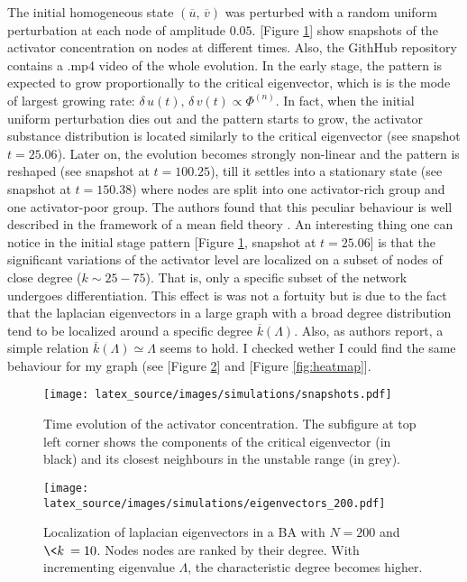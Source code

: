\noindent
The initial homogeneous state $(\overline{u},\,\overline{v})$ was perturbed with a random uniform perturbation at each node of amplitude $0.05$. [Figure \ref{fig:snapshots}] show snapshots of the activator concentration on nodes at different times. Also, the GithHub repository \cite{git} contains a .mp4 video of the whole evolution. \medskip \newline \noindent
In the early stage, the pattern is expected to grow proportionally to the critical eigenvector, which is is the mode of largest growing rate: $\delta\,u(t),\, \delta\,v(t) \propto \Phi^{(n)}$.
In fact, when the initial uniform perturbation dies out and the pattern starts to grow, the activator substance distribution is located similarly to the critical eigenvector (see snapshot $t = 25.06$). Later on, the evolution becomes strongly non-linear and the pattern is reshaped (see snapshot at $t = 100.25$), till it settles into a stationary state (see snapshot at $t = 150.38$) where nodes are split into one activator-rich group and one activator-poor group. The authors found that this peculiar behaviour is well described in the framework of a mean field theory \cite{main_network}. \medskip \newline \noindent
An interesting thing one can notice in the initial stage pattern [Figure \ref{fig:snapshots}, snapshot at $t = 25.06$] is that the significant variations of the activator level are localized on a subset of nodes of close degree ($k \sim 25-75$). That is, only a specific subset of the network undergoes differentiation. This effect is was not a fortuity but is due to the fact that the laplacian eigenvectors in a large graph with a broad degree distribution tend to be localized around a specific degree $\overline{k}(\Lambda)$. Also, as authors report, a simple relation $\overline{k}(\Lambda) \simeq \Lambda$ seems to hold. I checked wether I could find the same behaviour for my graph (see [Figure \ref{fig:eigenvectors}] and [Figure \ref{fig:heatmap}].
\begin{figure}[H]
    \centering
    \texttt{[image: latex\_source/images/simulations/snapshots.pdf]}
    \caption{Time evolution of the activator concentration. The subfigure at top left corner shows the components of the critical eigenvector (in black) and its closest neighbours in the unstable range (in grey).}
    \label{fig:snapshots}
\end{figure}
\begin{figure}[H]
\centering
\texttt{[image: latex\_source/images/simulations/eigenvectors\_200.pdf]}
\caption{Localization of laplacian eigenvectors in 
a BA with $N=200$ and $\<k\> = 10$. Nodes nodes are ranked by their degree. With incrementing eigenvalue $\Lambda$, the characteristic degree becomes higher.}
\label{fig:eigenvectors}
\end{figure}

